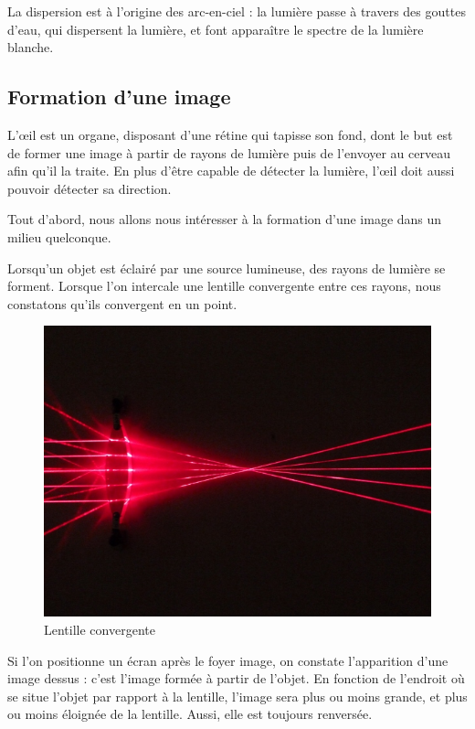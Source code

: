 \documentclass[a4paper, 12pt, onecolumn, openany]{report}
\begin{document}
	 La dispersion est à l’origine des arc-en-ciel : la lumière passe à travers des gouttes d’eau, qui dispersent la lumière, et font apparaître le spectre de la lumière blanche. 

\newpage
		\subsection{Formation d'une image}
		L’œil est un organe, disposant d’une rétine qui tapisse son fond, dont le but est de former une image à partir de rayons de lumière puis de l’envoyer au cerveau afin qu’il la traite. En plus d’être capable de détecter la lumière, l’œil doit aussi pouvoir détecter sa direction. 
		
	Tout d’abord, nous allons nous intéresser à la formation d’une image dans un milieu quelconque.
	
	Lorsqu’un objet est éclairé par une source lumineuse, des rayons de lumière se forment. Lorsque l’on intercale une lentille convergente entre ces rayons, nous constatons qu’ils convergent en un point.
	
	\begin{figure}[h]
	\begin{center}
	\includegraphics[scale=0.3]{lentille_convergente.jpg}
	\end{center}
	\caption{Lentille convergente}
	\label{Lentille convergente}
	\end{figure}
		
	Si l’on positionne un écran après le foyer image, on constate l’apparition d’une image dessus : c’est l’image formée à partir de l’objet. En fonction de l’endroit où se situe l’objet par rapport à la lentille, l’image sera plus ou moins grande, et plus ou moins éloignée de la lentille. Aussi, elle est toujours renversée. 
	
\end{document}
